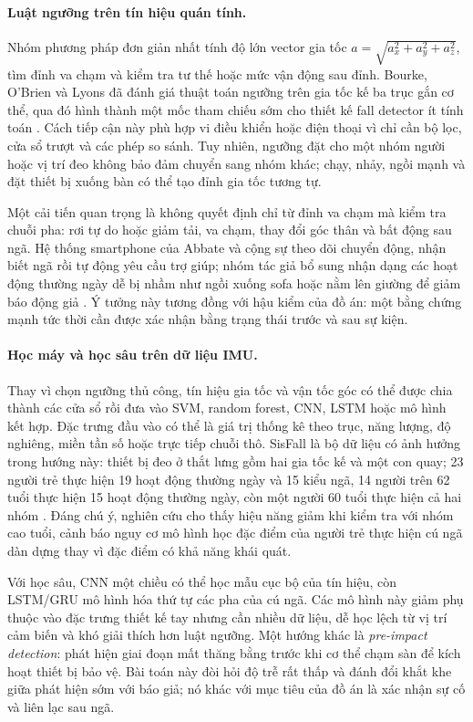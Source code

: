\paragraph{Luật ngưỡng trên tín hiệu quán tính.}
Nhóm phương pháp đơn giản nhất tính độ lớn vector gia tốc $a=\sqrt{a_x^2+a_y^2+a_z^2}$, tìm đỉnh va chạm và kiểm tra tư thế hoặc mức vận động sau đỉnh. Bourke, O'Brien và Lyons đã đánh giá thuật toán ngưỡng trên gia tốc kế ba trục gắn cơ thể, qua đó hình thành một mốc tham chiếu sớm cho thiết kế fall detector ít tính toán . Cách tiếp cận này phù hợp vi điều khiển hoặc điện thoại vì chỉ cần bộ lọc, cửa sổ trượt và các phép so sánh. Tuy nhiên, ngưỡng đặt cho một nhóm người hoặc vị trí đeo không bảo đảm chuyển sang nhóm khác; chạy, nhảy, ngồi mạnh và đặt thiết bị xuống bàn có thể tạo đỉnh gia tốc tương tự.

Một cải tiến quan trọng là không quyết định chỉ từ đỉnh va chạm mà kiểm tra chuỗi pha: rơi tự do hoặc giảm tải, va chạm, thay đổi góc thân và bất động sau ngã. Hệ thống smartphone của Abbate và cộng sự theo dõi chuyển động, nhận biết ngã rồi tự động yêu cầu trợ giúp; nhóm tác giả bổ sung nhận dạng các hoạt động thường ngày dễ bị nhầm như ngồi xuống sofa hoặc nằm lên giường để giảm báo động giả . Ý tưởng này tương đồng với hậu kiểm của đồ án: một bằng chứng mạnh tức thời cần được xác nhận bằng trạng thái trước và sau sự kiện.

\paragraph{Học máy và học sâu trên dữ liệu IMU.}
Thay vì chọn ngưỡng thủ công, tín hiệu gia tốc và vận tốc góc có thể được chia thành các cửa sổ rồi đưa vào SVM, random forest, CNN, LSTM hoặc mô hình kết hợp. Đặc trưng đầu vào có thể là giá trị thống kê theo trục, năng lượng, độ nghiêng, miền tần số hoặc trực tiếp chuỗi thô. SisFall là bộ dữ liệu có ảnh hưởng trong hướng này: thiết bị đeo ở thắt lưng gồm hai gia tốc kế và một con quay; 23 người trẻ thực hiện 19 hoạt động thường ngày và 15 kiểu ngã, 14 người trên 62 tuổi thực hiện 15 hoạt động thường ngày, còn một người 60 tuổi thực hiện cả hai nhóm . Đáng chú ý, nghiên cứu cho thấy hiệu năng giảm khi kiểm tra với nhóm cao tuổi, cảnh báo nguy cơ mô hình học đặc điểm của người trẻ thực hiện cú ngã dàn dựng thay vì đặc điểm có khả năng khái quát.

Với học sâu, CNN một chiều có thể học mẫu cục bộ của tín hiệu, còn LSTM/GRU mô hình hóa thứ tự các pha của cú ngã. Các mô hình này giảm phụ thuộc vào đặc trưng thiết kế tay nhưng cần nhiều dữ liệu, dễ học lệch từ vị trí cảm biến và khó giải thích hơn luật ngưỡng. Một hướng khác là \emph{pre-impact detection}: phát hiện giai đoạn mất thăng bằng trước khi cơ thể chạm sàn để kích hoạt thiết bị bảo vệ. Bài toán này đòi hỏi độ trễ rất thấp và đánh đổi khắt khe giữa phát hiện sớm với báo giả; nó khác với mục tiêu của đồ án là xác nhận sự cố và liên lạc sau ngã.

